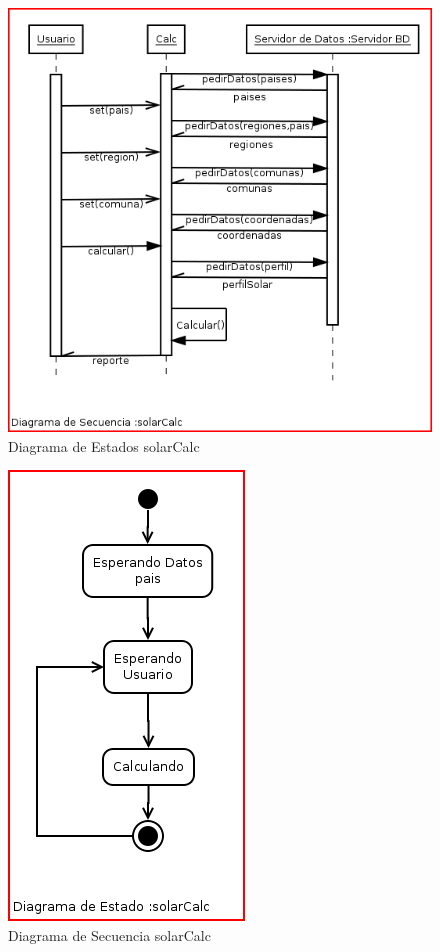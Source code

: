 \begin{figure}[h!]
        \centering
        \includegraphics[scale=0.35]{images/calcSecuencia}
        \caption{Diagrama de Estados solarCalc}
        \label{solarCalcS}
\end{figure}
\begin{figure}[h!]
        \centering
        \includegraphics[scale=0.35]{images/calcEstado}
        \caption{Diagrama de Secuencia solarCalc}
        \label{solarCalcE}
\end{figure}

